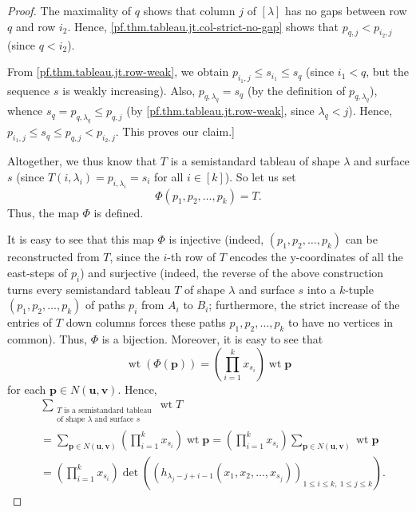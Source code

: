 \documentclass[reqno]{amsart}%
\newcommand{\0}{\phantom{c}}
\let\sumnonlimits\sum
\let\prodnonlimits\prod
\renewcommand{\sum}{\sumnonlimits\limits}
\renewcommand{\prod}{\prodnonlimits\limits}
\theoremstyle{plain}
\theoremstyle{definition}
\numberwithin{equation}{section}
\begin{document}
\begin{proof}
The maximality of $q$ shows that column $j$ of $\left[  \lambda\right]  $ has
no gaps between row $q$ and row $i_{2}$. Hence,
\eqref{pf.thm.tableau.jt.col-strict-no-gap} shows that $p_{q,j}<p_{i_{2},j}$
(since $q<i_{2}$).

From \eqref{pf.thm.tableau.jt.row-weak}, we obtain $p_{i_{1},j}\leq s_{i_{1}%
}\leq s_{q}$ (since $i_{1}<q$, but the sequence $s$ is weakly increasing).
Also, $p_{q,\lambda_{q}}=s_{q}$ (by the definition of $p_{q,\lambda_{q}}$),
whence $s_{q}=p_{q,\lambda_{q}}\leq p_{q,j}$ (by
\eqref{pf.thm.tableau.jt.row-weak}, since $\lambda_{q}<j$). Hence,
$p_{i_{1},j}\leq s_{q}\leq p_{q,j}<p_{i_{2},j}$. This proves our claim.]

Altogether, we thus know that $T$ is a semistandard tableau of shape $\lambda$
and surface $s$ (since $T\left(  i,\lambda_{i}\right)  =p_{i,\lambda_{i}%
}=s_{i}$ for all $i\in\left[  k\right]  $). So let us set%
\[
\Phi\left(  p_{1},p_{2},\ldots,p_{k}\right)  =T.
\]
Thus, the map $\Phi$ is defined.

It is easy to see that this map $\Phi$ is injective (indeed, $\left(
p_{1},p_{2},\ldots,p_{k}\right)  $ can be reconstructed from $T$, since the
$i$-th row of $T$ encodes the y-coordinates of all the east-steps of $p_{i}$)
and surjective (indeed, the reverse of the above construction turns every
semistandard tableau $T$ of shape $\lambda$ and surface $s$ into a $k$-tuple
$\left(  p_{1},p_{2},\ldots,p_{k}\right)  $ of paths $p_{i}$ from $A_{i}$ to
$B_{i}$; furthermore, the strict increase of the entries of $T$ down columns
forces these paths $p_{1},p_{2},\ldots,p_{k}$ to have no vertices in common).
Thus, $\Phi$ is a bijection. Moreover, it is easy to see that
\[
\operatorname*{wt}\left(  \Phi\left(  \mathbf{p}\right)  \right)  =\left(
\prod_{i=1}^{k}x_{s_{i}}\right)  \operatorname*{wt}\mathbf{p}%
\]
for each $\mathbf{p}\in N\left(  \mathbf{u},\mathbf{v}\right)  $. Hence,%
\begin{align*}
&  \sum_{\substack{T\text{ is a semistandard tableau}\\\text{of shape }%
\lambda\text{ and surface }s}}\operatorname*{wt}T\\
&  =\sum_{\mathbf{p}\in N\left(  \mathbf{u},\mathbf{v}\right)  }\left(
\prod_{i=1}^{k}x_{s_{i}}\right)  \operatorname*{wt}\mathbf{p}=\left(
\prod_{i=1}^{k}x_{s_{i}}\right)  \sum_{\mathbf{p}\in N\left(  \mathbf{u}%
,\mathbf{v}\right)  }\operatorname*{wt}\mathbf{p}\\
&  =\left(  \prod_{i=1}^{k}x_{s_{i}}\right)  \det\left(  \left(
h_{\lambda_{j}-j+i-1}\left(  x_{1},x_{2},\ldots,x_{s_{j}}\right)  \right)
_{1\leq i\leq k,\ 1\leq j\leq k}\right)  .
\end{align*}

\end{proof}
\end{document}
